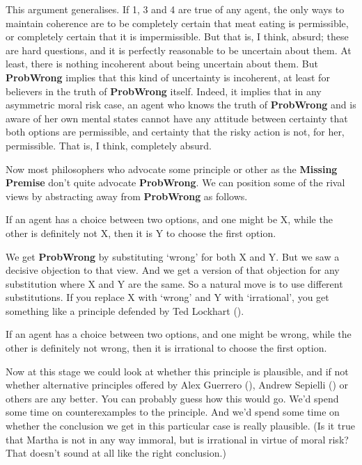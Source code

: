 \documentclass[
  10pt,
  letterpaper,
  DIV=11,
  numbers=noendperiod,
  twoside]{scrartcl}
\providecommand{\tightlist}{%
  \setlength{\itemsep}{0pt}\setlength{\parskip}{0pt}}\usepackage{longtable,booktabs,array}
\begin{document}
This argument generalises. If 1, 3 and 4 are true of any agent, the only
ways to maintain coherence are to be completely certain that meat eating
is permissible, or completely certain that it is impermissible. But that
is, I think, absurd; these are hard questions, and it is perfectly
reasonable to be uncertain about them. At least, there is nothing
incoherent about being uncertain about them. But \textbf{ProbWrong}
implies that this kind of uncertainty is incoherent, at least for
believers in the truth of \textbf{ProbWrong} itself. Indeed, it implies
that in any asymmetric moral risk case, an agent who knows the truth of
\textbf{ProbWrong} and is aware of her own mental states cannot have any
attitude between certainty that both options are permissible, and
certainty that the risky action is not, for her, permissible. That is, I
think, completely absurd.

Now most philosophers who advocate some principle or other as the
\textbf{Missing Premise} don't quite advocate \textbf{ProbWrong}. We can
position some of the rival views by abstracting away from
\textbf{ProbWrong} as follows.

\begin{description}
\tightlist
\item[General Principle]
If an agent has a choice between two options, and one might be X, while
the other is definitely not X, then it is Y to choose the first option.
\end{description}

We get \textbf{ProbWrong} by substituting `wrong' for both X and Y. But
we saw a decisive objection to that view. And we get a version of that
objection for any substitution where X and Y are the same. So a natural
move is to use different substitutions. If you replace X with `wrong'
and Y with `irrational', you get something like a principle defended by
Ted Lockhart ().

\begin{description}
\tightlist
\item[What Might be Wrong Is Irrational]
If an agent has a choice between two options, and one might be wrong,
while the other is definitely not wrong, then it is irrational to choose
the first option.
\end{description}

Now at this stage we could look at whether this principle is plausible,
and if not whether alternative principles offered by Alex Guerrero
(), Andrew Sepielli
() or others are any better. You can
probably guess how this would go. We'd spend some time on
counterexamples to the principle. And we'd spend some time on whether
the conclusion we get in this particular case is really plausible. (Is
it true that Martha is not in any way immoral, but is irrational in
virtue of moral risk? That doesn't sound at all like the right
conclusion.)
\end{document}
